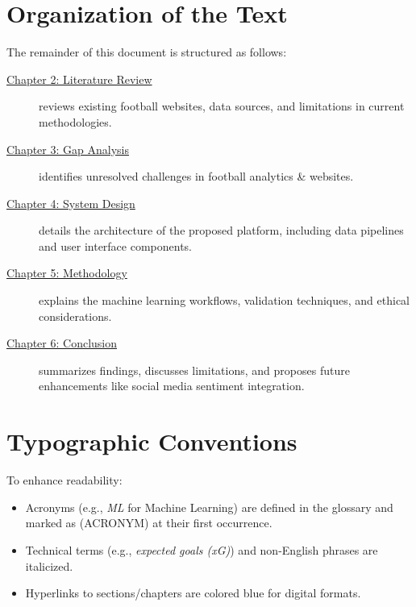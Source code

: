 \section{Organization of the Text}
The remainder of this document is structured as follows:  
\begin{description}
    \item[{\hyperref[chap:literature-review]{Chapter 2: Literature Review}}] reviews existing football websites, data sources, and limitations in current methodologies.  
    \item[{\hyperref[chap:gap-analysis]{Chapter 3: Gap Analysis}}] identifies unresolved challenges in football analytics & websites.  
    \item[{\hyperref[chap:system-analysis-and-design]{Chapter 4: System Design}}] details the architecture of the proposed platform, including data pipelines and user interface components.  
    \item[{\hyperref[chap:Methodology]{Chapter 5: Methodology}}] explains the machine learning workflows, validation techniques, and ethical considerations.  
    \item[{\hyperref[chap:conclusion]{Chapter 6: Conclusion}}] summarizes findings, discusses limitations, and proposes future enhancements like social media sentiment integration.  
\end{description}

\section*{Typographic Conventions}
To enhance readability:  
\begin{itemize}
    \item Acronyms (e.g., \emph{ML} for Machine Learning) are defined in the glossary and marked as (ACRONYM) at their first occurrence.
    \item Technical terms (e.g., \emph{expected goals (xG)}) and non-English phrases are italicized.
    \item Hyperlinks to sections/chapters are colored blue for digital formats.
\end{itemize}